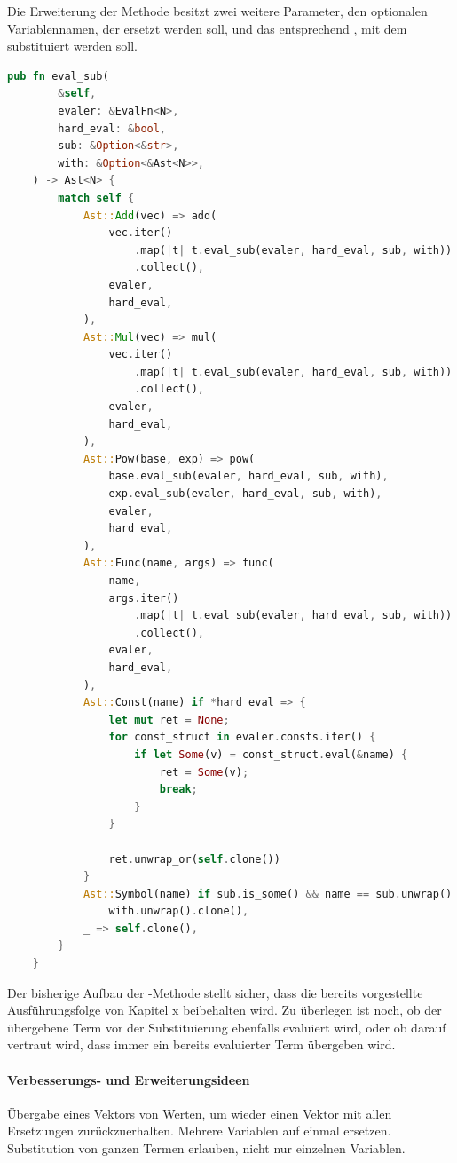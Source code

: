 \documentclass[11pt,a4paper, ngerman]{article}
\begin{document}
Die Erweiterung der Methode besitzt zwei weitere Parameter, den optionalen Variablennamen, der ersetzt werden soll, und das entsprechend , mit dem substituiert werden soll.
\begin{lstlisting}[language=rust, caption={Erweiterung pub fn eval}]
    pub fn eval_sub(
        &self,
        evaler: &EvalFn<N>,
        hard_eval: &bool,
        sub: &Option<&str>,
        with: &Option<&Ast<N>>,
    ) -> Ast<N> {
        match self {
            Ast::Add(vec) => add(
                vec.iter()
                    .map(|t| t.eval_sub(evaler, hard_eval, sub, with))
                    .collect(),
                evaler,
                hard_eval,
            ),
            Ast::Mul(vec) => mul(
                vec.iter()
                    .map(|t| t.eval_sub(evaler, hard_eval, sub, with))
                    .collect(),
                evaler,
                hard_eval,
            ),
            Ast::Pow(base, exp) => pow(
                base.eval_sub(evaler, hard_eval, sub, with),
                exp.eval_sub(evaler, hard_eval, sub, with),
                evaler,
                hard_eval,
            ),
            Ast::Func(name, args) => func(
                name,
                args.iter()
                    .map(|t| t.eval_sub(evaler, hard_eval, sub, with))
                    .collect(),
                evaler,
                hard_eval,
            ),
            Ast::Const(name) if *hard_eval => {
                let mut ret = None;
                for const_struct in evaler.consts.iter() {
                    if let Some(v) = const_struct.eval(&name) {
                        ret = Some(v);
                        break;
                    }
                }

                ret.unwrap_or(self.clone())
            }
            Ast::Symbol(name) if sub.is_some() && name == sub.unwrap() => 
                with.unwrap().clone(),
            _ => self.clone(),
        }
    }
\end{lstlisting}

Der bisherige Aufbau der -Methode stellt sicher, dass die bereits vorgestellte Ausführungsfolge von Kapitel x beibehalten wird. Zu überlegen ist noch, ob der übergebene Term vor der Substituierung ebenfalls evaluiert wird, oder ob darauf vertraut wird, dass immer ein bereits evaluierter Term übergeben wird.

\paragraph{Verbesserungs- und Erweiterungsideen} Übergabe eines Vektors von Werten, um wieder einen Vektor mit allen Ersetzungen zurückzuerhalten. Mehrere Variablen auf einmal ersetzen. Substitution von ganzen Termen erlauben, nicht nur einzelnen Variablen.
\end{document}
